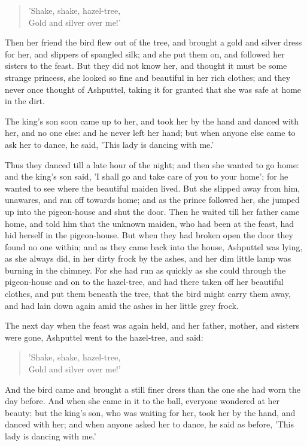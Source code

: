\documentclass[12pt]{book}
\begin{document}
\begin{verse}
 'Shake, shake, hazel-tree,\\
  Gold and silver over me!'
\end{verse}

Then her friend the bird flew out of the tree, and brought a gold and
silver dress for her, and slippers of spangled silk; and she put them
on, and followed her sisters to the feast. But they did not know her,
and thought it must be some strange princess, she looked so fine and
beautiful in her rich clothes; and they never once thought of
Ashputtel, taking it for granted that she was safe at home in the
dirt.

The king's son soon came up to her, and took her by the hand and
danced with her, and no one else: and he never left her hand; but when
anyone else came to ask her to dance, he said, 'This lady is dancing
with me.'

Thus they danced till a late hour of the night; and then she wanted to
go home: and the king's son said, 'I shall go and take care of you to
your home'; for he wanted to see where the beautiful maiden lived. But
she slipped away from him, unawares, and ran off towards home; and as
the prince followed her, she jumped up into the pigeon-house and shut
the door. Then he waited till her father came home, and told him that
the unknown maiden, who had been at the feast, had hid herself in the
pigeon-house. But when they had broken open the door they found no one
within; and as they came back into the house, Ashputtel was lying, as
she always did, in her dirty frock by the ashes, and her dim little
lamp was burning in the chimney. For she had run as quickly as she
could through the pigeon-house and on to the hazel-tree, and had there
taken off her beautiful clothes, and put them beneath the tree, that
the bird might carry them away, and had lain down again amid the ashes
in her little grey frock.

The next day when the feast was again held, and her father, mother,
and sisters were gone, Ashputtel went to the hazel-tree, and said:

\begin{verse}
 'Shake, shake, hazel-tree,\\
  Gold and silver over me!'
\end{verse}

And the bird came and brought a still finer dress than the one she had
worn the day before. And when she came in it to the ball, everyone
wondered at her beauty: but the king's son, who was waiting for her,
took her by the hand, and danced with her; and when anyone asked her
to dance, he said as before, 'This lady is dancing with me.'
\end{document}
